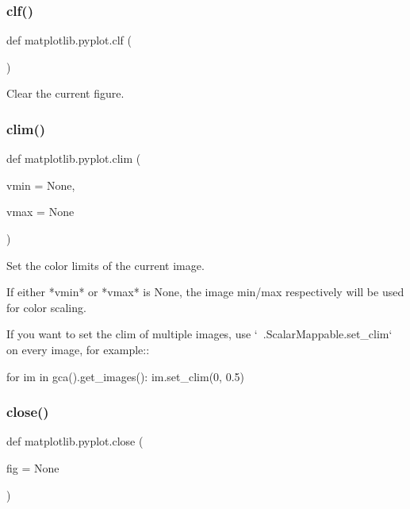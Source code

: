 \mbox{\label{namespacematplotlib_1_1pyplot_ac5db7fbf4e6074954aedee52f73bb91d}} 
\subsubsection{\texorpdfstring{clf()}{clf()}}
{\footnotesize\ttfamily def matplotlib.\+pyplot.\+clf (\begin{DoxyParamCaption}{ }\end{DoxyParamCaption})}

\begin{DoxyVerb}Clear the current figure.\end{DoxyVerb}
 \mbox{\label{namespacematplotlib_1_1pyplot_a413472148a3c1f5a2665920f297d1ff5}} 
\subsubsection{\texorpdfstring{clim()}{clim()}}
{\footnotesize\ttfamily def matplotlib.\+pyplot.\+clim (\begin{DoxyParamCaption}\item[{}]{vmin = {\ttfamily None},  }\item[{}]{vmax = {\ttfamily None} }\end{DoxyParamCaption})}

\begin{DoxyVerb}Set the color limits of the current image.

If either *vmin* or *vmax* is None, the image min/max respectively
will be used for color scaling.

If you want to set the clim of multiple images, use
`~.ScalarMappable.set_clim` on every image, for example::

  for im in gca().get_images():
      im.set_clim(0, 0.5)\end{DoxyVerb}
 \mbox{\label{namespacematplotlib_1_1pyplot_ab3ecb1d03935c8ab87b4629a19b21109}} 
\subsubsection{\texorpdfstring{close()}{close()}}
{\footnotesize\ttfamily def matplotlib.\+pyplot.\+close (\begin{DoxyParamCaption}\item[{}]{fig = {\ttfamily None} }\end{DoxyParamCaption})}


